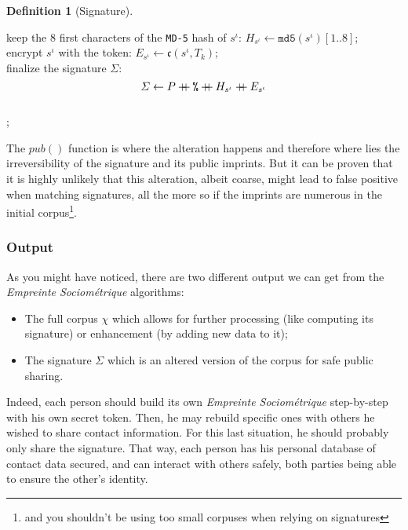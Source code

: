 \documentclass[twoside,twocolumn]{article}
\newcommand{\concat}{\mathbin{{+}\mspace{-8mu}{+}}}
\theoremstyle{definition}
\newtheorem{definition}{Definition}
\theoremstyle{remark}
\begin{document}
\begin{definition}[Signature]
\begin{algorithm}
{            \If{$i < norm{\mathcal{R}}$}{
                $s^\iota \gets s^\iota \concat \texttt{SEC\_SEP}$; \\
            }
        }
        keep the 8 first characters of the \texttt{MD-5} hash of $s^\iota$: $H_{s^\iota} \gets \texttt{md5}(s^\iota)[1..8]$; \\
        encrypt $s^\iota$ with the token: $E_{s^\iota} \gets \mathfrak{c}(s^\iota, T_k)$; \\
        finalize the signature $\varSigma$:\begin{equation}
            \label{eq:signature}
            \varSigma \gets P \concat \texttt{\%} \concat H_{s^\iota} \concat E_{s^\iota}
        \end{equation} \\
        \Return{$\varSigma$};
        \caption{Signature construction}
        \label{algo:signature}
    \end{algorithm}

    The $pub()$ function is where the alteration happens and therefore where lies the irreversibility of the signature and its public imprints.
    But it can be proven that it is highly unlikely that this alteration, albeit coarse, might lead to false positive when matching signatures, all the 
    more so if the imprints are numerous in the initial corpus\footnote{and you shouldn't be using too small corpuses when relying on signatures}.
\end{definition}

\subsubsection{Output}

As you might have noticed, there are two different output we can get from the \emph{Empreinte Sociométrique} algorithms:
\begin{itemize}
    \item The full corpus $\chi$ which allows for further processing (like computing its signature) or enhancement (by adding new data to it);
    \item The signature $\varSigma$ which is an altered version of the corpus for safe public sharing.
\end{itemize}

Indeed, each person should build its own \emph{Empreinte Sociométrique} step-by-step with his own secret token. Then, he may rebuild specific ones 
with others he wished to share contact information. For this last situation, he should probably only share the signature.
That way, each person has his personal database of contact data secured, and can interact with others safely, both parties being able to ensure the 
other's identity.
\end{document}
